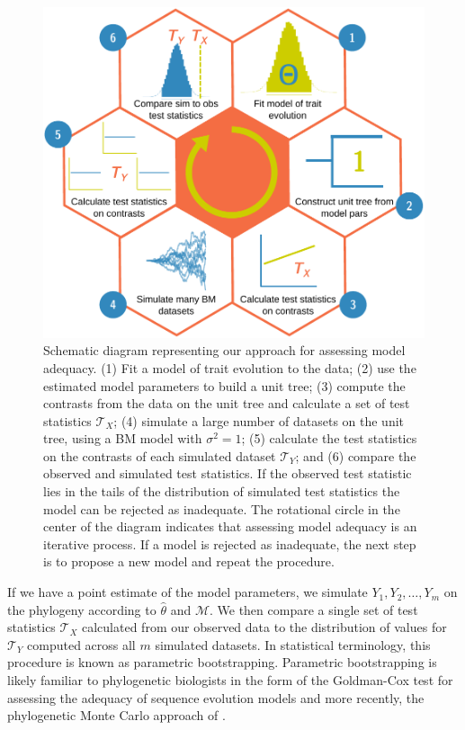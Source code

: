 \begin{figure}[p]
  \centering
  \includegraphics[width=\textwidth]{figs/flow-diagram}
  \caption[Schematic of framework for assessing model adequacy]{Schematic diagram representing our approach for assessing model adequacy. (1) Fit a model of trait evolution to the data; (2) use the estimated model parameters to build a unit tree; (3) compute the contrasts from the data on the unit tree and calculate a set of test statistics $\mathcal{T}_X$; (4) simulate a large number of datasets on the unit tree, using a BM model with $\sigma^2= 1$; (5) calculate the test statistics on the contrasts of each simulated dataset $\mathcal{T}_Y$; and (6) compare the observed and simulated test statistics. If the observed test statistic lies in the tails of the distribution of simulated test statistics the model can be rejected as inadequate. The rotational circle in the center of the diagram indicates that assessing model adequacy is an iterative process. If a model is rejected as inadequate, the next step is to propose a new model and repeat the procedure.}
  \label{fig:flowchart}
\end{figure}

If we have a point estimate of the model parameters, we simulate $Y_1, Y_2, \ldots, Y_m$ on the phylogeny according to $\hat{\theta}$ and $\mathcal{M}$. We then compare a single set of test statistics $\mathcal{T}_X$ calculated from our observed data to the distribution of values for $\mathcal{T}_Y$ computed across all $m$ simulated datasets. In statistical terminology, this procedure is known as parametric bootstrapping. Parametric bootstrapping is likely familiar to phylogenetic biologists in the form of the Goldman-Cox test \citep{Goldman} for assessing the adequacy of sequence evolution models and more recently, the phylogenetic Monte Carlo approach of \citet{Boettiger2012}.

